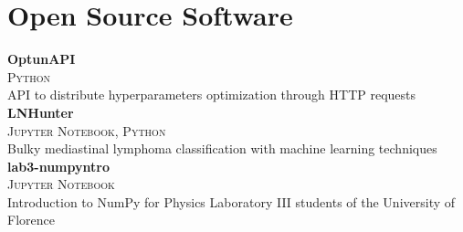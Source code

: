 \newcommand{\pkgname}[1]
  {\normalsize \color{hlcolor-0} \textbf{#1}}

\newcommand{\pkginfo}[1]
  {\small \color{hlcolor-1} \textsc{#1}}
  
\newcommand{\pkgdesc}[1]
  {\normalsize \color{maincolor} {#1}}


\section*{Open Source Software}
\begin{cvcontent}
  \pkgname{OptunAPI} \hfill
  \\
  \pkginfo{Python}\\
  \pkgdesc{API to distribute hyperparameters optimization through HTTP requests}
  \\ [3mm]
  \pkgname{LNHunter} \hfill
  \\
  \pkginfo{Jupyter Notebook, Python}\\
  \pkgdesc{Bulky mediastinal lymphoma classification with machine learning techniques}
  \\ [3mm]
  \pkgname{lab3-numpyntro} \hfill
  \\
  \pkginfo{Jupyter Notebook}\\
  \pkgdesc{Introduction to NumPy for Physics Laboratory III students of the University of Florence}
\end{cvcontent}